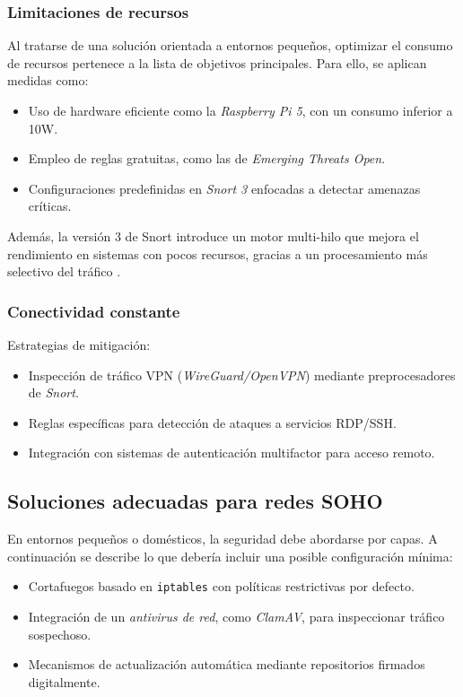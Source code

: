 \documentclass[11pt,a4paper,twoside]{report}
\begin{document}
\subsubsection{Limitaciones de recursos}

Al tratarse de una solución orientada a entornos pequeños, optimizar el consumo de recursos pertenece a la lista de objetivos principales. Para ello, se aplican medidas como:

\begin{itemize}
	\item Uso de hardware eficiente como la \textit{Raspberry Pi 5}, con un consumo inferior a 10W.
	\item Empleo de reglas gratuitas, como las de \textit{Emerging Threats Open}.
	\item Configuraciones predefinidas en \textit{Snort 3} enfocadas a detectar amenazas críticas.
\end{itemize}

Además, la versión 3 de Snort introduce un motor multi-hilo que mejora el rendimiento en sistemas con pocos recursos, gracias a un procesamiento más selectivo del tráfico \cite{park2017performance}.


\subsubsection{Conectividad constante}
Estrategias de mitigación:
\begin{itemize}
	\item Inspección de tráfico VPN (\textit{WireGuard/OpenVPN}) mediante preprocesadores de \textit{Snort}.
	\item Reglas específicas para detección de ataques a servicios RDP/SSH.
	\item Integración con sistemas de autenticación multifactor para acceso remoto.
\end{itemize}

\subsection{Soluciones adecuadas para redes SOHO}

En entornos pequeños o domésticos, la seguridad debe abordarse por capas. A continuación se describe lo que debería incluir una posible configuración mínima:

\begin{itemize}
	\item Cortafuegos basado en \texttt{iptables} con políticas restrictivas por defecto.
	\item Integración de un \textit{antivirus de red}, como \textit{ClamAV}, para inspeccionar tráfico sospechoso.
	\item Mecanismos de actualización automática mediante repositorios firmados digitalmente.
\end{itemize}
\end{document}
